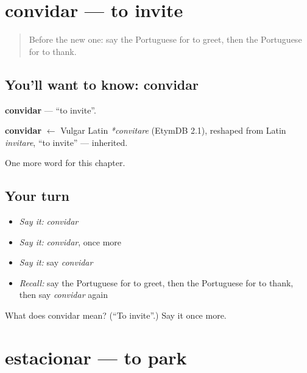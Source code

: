 \section[convidar]{convidar — to invite}

\label{lesson:PT-C171-convidar}



\begin{quote}
Before the new one: say the Portuguese for to greet, then the Portuguese for to thank.
\end{quote}

\subsection*{You'll want to know: convidar}
\textbf{convidar} — \textquotedblleft{}to invite\textquotedblright{}.

\begin{cousinweb}
\textbf{convidar} $\leftarrow$ Vulgar Latin \emph{*convitare} (EtymDB 2.1), reshaped from Latin \emph{invitare}, \textquotedblleft{}to invite\textquotedblright{} — inherited.
\end{cousinweb}

\begin{grammarlens}[title={What you've built}]
One more word for this chapter.
\end{grammarlens}

\subsection*{Your turn}
\begin{itemize}
\raggedright
  \item \emph{Say it:} \emph{convidar}
  \item \emph{Say it:} \emph{convidar}, once more
  \item \emph{Say it:} say \emph{convidar}
  \item \emph{Recall:} say the Portuguese for to greet, then the Portuguese for to thank, then say \emph{convidar} again
\end{itemize}

\begin{tcolorbox}[breakable,colback=teal!4,colframe=teal!35!black,title={Before you move on}]
What does convidar mean? (\textquotedblleft{}To invite\textquotedblright{}.) Say it once more.
\end{tcolorbox}
\section[estacionar]{estacionar — to park}

